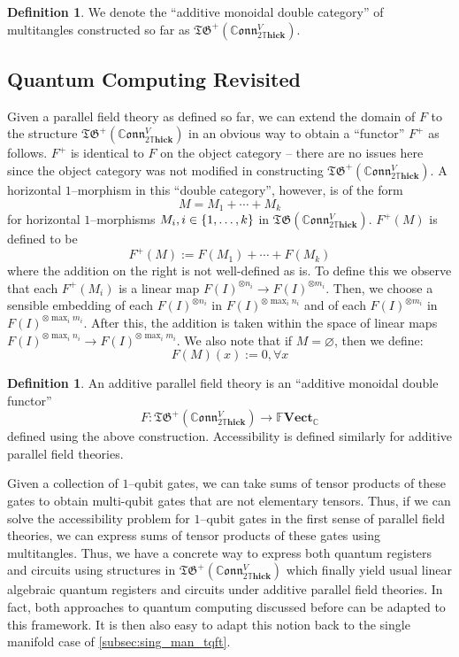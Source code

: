 \documentclass{amsart}
\newcommand{\C}{\mathbb{C}}
\newcommand{\tensor}{\otimes}
\renewcommand{\to}[1][]{\stackrel{#1}{\longrightarrow}}
\newcommand{\br}[1]{\left( #1 \right)}
\newcommand{\curly}[1]{\left\{ #1 \right\}}
\newcommand{\set}[2][]{\ifthenelse{\equal{#1}{}}
                                  {\curly{#2}}
                                  {\curly{#1\ \textbf{:}\ #2}}}
\newcommand{\FFVect}{\mathbb{F}\textbf{Vect}}
\newcommand{\DThick}{2\mathbb{T}\mathbf{hick}}
\newcommand{\TG}{\mathfrak{TG}}
\newcommand{\CConn}{\mathbb{C}\mathfrak{onn}}
\numberwithin{thm}{section}
\theoremstyle{definition}
\newtheorem{defn}[thm]{Definition}
\begin{document}
\begin{defn}
We denote the ``additive monoidal double category'' of multitangles constructed
so far as $\TG^+(\CConn^V_{\DThick})$.
\end{defn}

%

\subsection{Quantum Computing Revisited}

Given a parallel field theory as defined so far, we can extend the domain of
$F$ to the structure $\TG^+\br{\CConn^V_{\DThick}}$ in an obvious way to obtain
a ``functor'' $F^+$ as follows. $F^+$ is identical to $F$ on the object category
-- there are no issues here since the object category was not modified in
constructing $\TG^+\br{\CConn^V_{\DThick}}$. A horizontal $1$--morphism in this
``double category'', however, is of the form
\[
  M = M_1 + \cdots + M_k
\]
for horizontal $1$--morphisms $M_i, i \in \set{1, \dots, k}$ in
$\TG\br{\CConn^V_{\DThick}}$. $F^+(M)$ is defined to be
\[
  F^+(M) := F(M_1) + \cdots + F(M_k)
\]
where the addition on the right is not well-defined as is. To define this we
observe that each $F^+(M_i)$ is a linear map
$F(I)^{\tensor n_i} \to F(I)^{\tensor m_i}$. Then, we choose a sensible
embedding of each $F(I)^{\tensor n_i}$ in $F(I)^{\tensor \max_i n_i}$ and of
each $F(I)^{\tensor m_i}$ in $F(I)^{\tensor \max_i m_i}$. After this, the
addition is taken within the space of linear maps
$F(I)^{\tensor \max_i n_i} \to F(I)^{\tensor \max_i m_i}$. We also note that if
$M = \varnothing$, then we define:
\[
  F(M)(x) := 0, \forall x
\]

\begin{defn}
An additive parallel field theory is an ``additive monoidal double functor''
\[
  F : \TG^+(\CConn^V_{\DThick}) \to \FFVect_{\C}
\]
defined using the above construction.
Accessibility is defined similarly for additive parallel field theories.
\end{defn}

Given a collection of $1$--qubit gates, we can take sums of tensor products of
these gates to obtain multi-qubit gates that are not elementary tensors.  Thus,
if we can solve the accessibility problem for $1$--qubit gates in the first
sense of parallel field theories, we can express sums of tensor products of
these gates using multitangles. Thus, we have a concrete way to express both
quantum registers and circuits using structures in $\TG^+(\CConn^V_{\DThick})$
which finally yield usual linear algebraic quantum registers and circuits under
additive parallel field theories. In fact, both approaches to quantum computing
discussed before can be adapted to this framework. It is then also easy to adapt
this notion back to the single manifold case of \ref{subsec:sing_man_tqft}.
\end{document}
